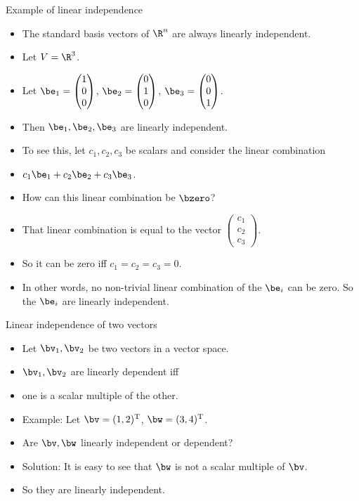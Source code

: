 \documentclass[handout]{beamer}
\begin{document}
\begin{frame}{Example of linear independence}

\begin{itemize}
\item The standard basis vectors of $\R^n$ are always linearly independent.
\item Let $V = \R^3$.
\item Let $\be_1 =
\begin{pmatrix}
1 \\ 0 \\ 0
\end{pmatrix}
$,
$\be_2 =
\begin{pmatrix}
0 \\ 1 \\ 0
\end{pmatrix}
$,
$\be_3=
\begin{pmatrix}
0 \\ 0 \\ 1
\end{pmatrix}
$.

\item Then $\be_1,\be_2,\be_3$ are linearly independent.
\item To see this, let $c_1,c_2,c_3$ be scalars and consider the linear combination
\item $c_1\be_1+c_2\be_2+c_3\be_3$.
\item How can this linear combination be $\bzero$?
\item That linear combination is equal to the vector
$
\begin{pmatrix}
c_1 \\ c_2 \\ c_3
\end{pmatrix}
$.
\item So it can be zero iff $c_1=c_2=c_3=0$.
\item In other words, no non-trivial linear combination of the $\be_i$ can be zero.
So the $\be_i$ are linearly independent.
\end{itemize}

\end{frame}


\begin{frame}{Linear independence of two vectors}

\begin{itemize}
\item Let $\bv_1,\bv_2$ be two vectors in a vector space.
\item $\bv_1,\bv_2$ are linearly dependent iff
\item one is a scalar multiple of the other.
\item Example: Let $\bv=(1,2)^{\text{T}}$, $\bw=(3,4)^{\text{T}}$.
\item Are $\bv,\bw$ linearly independent or dependent?
\item Solution: It is easy to see that $\bw$ is not a scalar multiple of $\bv$.
\item So they are linearly independent.
\end{itemize}

\end{frame}
\end{document}
